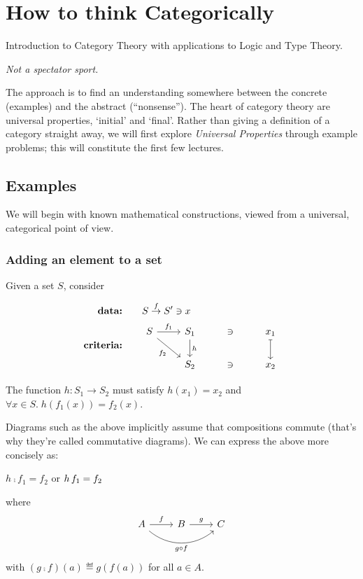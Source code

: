     \newpage
    \chapter{How to think Categorically}
    
    Introduction to Category Theory with applications to Logic and Type Theory.
    
    \emph{Not a spectator sport.}
    
    The approach is to find an understanding somewhere between the concrete
    (examples) and the abstract (``nonsense''). The heart of category theory are
    universal properties, `initial' and `final'. 
    Rather than giving a definition of a category straight away, we will first
    explore \emph{Universal Properties} through example problems; this will
    constitute the first few lectures.
    
    \section{Examples}
    We will begin with known mathematical constructions, viewed from a universal,
    categorical point of view.
    
    \subsection{Adding an element to a set}
    \label{add-element-set}
    
    Given a set $S$, consider
    
    \begin{align*}
        \textbf{data:}&\qquad S \overset{f}{\rightarrow} S^\prime \ni x \\
        \textbf{criteria:}& \qquad 
        \begin{tikzcd}[ampersand replacement=\&]
            S \arrow[r, "f_1"]
              \arrow[dr, swap, "f_2"]
              \&
            S_1 \arrow[d, "h"] \& \ni \& x_1 \arrow[d, mapsto]
              \\
              {}\&
            S_2 \& \ni \& x_2
        \end{tikzcd}
    \end{align*}
    
    The function $h : S_1 \rightarrow S_2$ must satisfy $h(x_1) = x_2$ and 
    $\forall x \in S .\; h(f_1(x)) = f_2(x)$.
    
    \begin{framed}
    Diagrams such as the above implicitly assume that compositions commute (that's
    why they're called commutative diagrams). We can express the above more
    concisely as:
    \begin{center}
    $h\comp f_1 = f_2$
    \quad or \quad
    $h\, f_1 = f_2$
    \end{center}
    where 
    $$
    \begin{tikzcd}
        A \arrow[r, "f"] \arrow[rr, swap, bend right=40, "g \circ f"] & B \arrow[r, "g"] & C
    \end{tikzcd}
    $$
    with $(g\comp f)(a)\eqdef g(f(a))$ for all $a\in A$.
    \end{framed}
    
